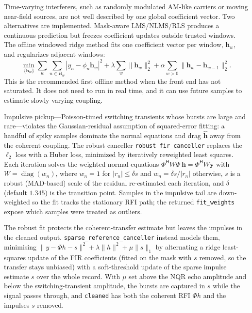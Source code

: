 \documentclass[11pt,oneside]{report}
\newcommand{\code}[1]{\texttt{#1}}
\begin{document}
Time-varying interferers, such as randomly modulated AM-like carriers or moving
near-field sources, are not well described by one global coefficient vector.
Two alternatives are implemented. Mask-aware LMS/NLMS/RLS produces a continuous
prediction but freezes coefficient updates outside trusted windows. The offline
windowed ridge method fits one coefficient vector per window,
\(\mathbf{h}_w\), and regularizes adjacent windows:
\[
  \min_{\{\mathbf{h}_w\}}
  \sum_w\sum_{n\in B_w}|y_n-\phi_n\mathbf{h}_w|^2
  + \lambda\sum_w\|\mathbf{h}_w\|_2^2
  + \alpha\sum_{w>0}\|\mathbf{h}_w-\mathbf{h}_{w-1}\|_2^2.
\]
This is the recommended first offline method when the front end has not
saturated. It does not need to run in real time, and it can use future samples
to estimate slowly varying coupling.

Impulsive pickup---Poisson-timed switching transients whose bursts are large and
rare---violates the Gaussian-residual assumption of squared-error fitting: a
handful of spiky samples dominate the normal equations and drag
\(\widehat{\mathbf{h}}\) away from the coherent coupling. The robust canceller
\code{robust\_fir\_canceller} replaces the \(\ell_2\) loss with a Huber loss,
minimized by iteratively reweighted least squares. Each iteration solves the
weighted normal equations \(\Phi^{\mathsf H} W \Phi\,\mathbf{h} =
\Phi^{\mathsf H} W \mathbf{y}\) with \(W=\operatorname{diag}(w_n)\), where
\(w_n = 1\) for \(|r_n|\le\delta s\) and \(w_n=\delta s/|r_n|\) otherwise, \(s\)
is a robust (MAD-based) scale of the residual re-estimated each iteration, and
\(\delta\) (default \(1.345\)) is the transition point. Samples in the impulsive
tail are down-weighted so the fit tracks the stationary RFI path; the returned
\code{fit\_weights} expose which samples were treated as outliers.

The robust fit protects the coherent-transfer estimate but leaves the impulses in
the cleaned output. \code{sparse\_reference\_canceller} instead models them,
minimising \(\lVert y - \Phi h - s\rVert^2 + \lambda\lVert h\rVert^2 +
\mu\lVert s\rVert_1\) by alternating a ridge least-squares update of the FIR
coefficients (fitted on the mask with \(s\) removed, so the transfer stays
unbiased) with a soft-threshold update of the sparse impulse estimate \(s\) over
the whole record. With \(\mu\) set above the NQR echo amplitude and below the
switching-transient amplitude, the bursts are captured in \(s\) while the signal
passes through, and \code{cleaned} has both the coherent RFI \(\Phi h\) and the
impulses \(s\) removed.
\end{document}
